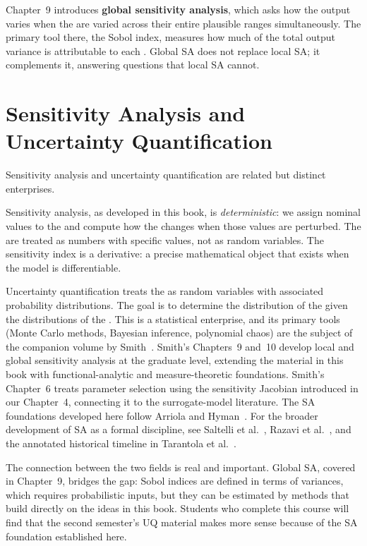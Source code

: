 Chapter~9 introduces \textbf{global sensitivity analysis},
which asks how the output varies when the \POIs are varied
across their entire plausible ranges simultaneously.
The primary tool there, the Sobol index, measures
how much of the total output variance is attributable to
each \POI. Global SA does not replace local SA; it
complements it, answering questions that local SA cannot.

\section{Sensitivity Analysis and Uncertainty Quantification}
\label{sec:sauq}

Sensitivity analysis and uncertainty quantification are
related but distinct enterprises.

Sensitivity analysis, as developed in this book, is
\emph{deterministic}: we assign nominal values to the \POIs
and compute how the \QOI changes when those values are
perturbed. The \POIs are treated as numbers with specific
values, not as random variables. The sensitivity index
is a derivative: a precise mathematical object that exists
when the model is differentiable.

Uncertainty quantification treats the \POIs as random variables
with associated probability distributions. The goal is to
determine the distribution of the \QOI given the distributions
of the \POIs. This is a statistical enterprise, and its primary
tools (Monte Carlo methods, Bayesian inference, polynomial chaos)
are the subject of the companion volume by Smith~\cite{smith2014uncertainty}.
Smith's Chapters~9 and~10 develop local and global sensitivity analysis
at the graduate level, extending the material in this book with
functional-analytic and measure-theoretic foundations.
Smith's Chapter~6 treats parameter selection using the sensitivity
Jacobian introduced in our Chapter~4, connecting it to the
surrogate-model literature.
The SA foundations developed here follow Arriola and Hyman~\cite{arriola2007being,arriola2009sensitivity}.
For the broader development of SA as a formal discipline, see Saltelli et al.~\cite{saltelli2021sensitivity},
Razavi et al.~\cite{razavi2021future}, and the annotated historical timeline in
Tarantola et al.~\cite{tarantola2024annotated}.

The connection between the two fields is real and important.
Global SA, covered in Chapter~9, bridges the gap: Sobol indices
are defined in terms of variances, which requires probabilistic
inputs, but they can be estimated by methods that build directly
on the ideas in this book. Students who complete this course
will find that the second semester's UQ material makes more
sense because of the SA foundation established here.

